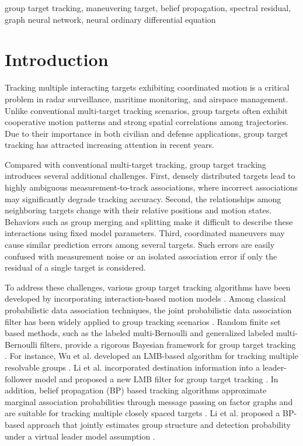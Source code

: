 \documentclass[10pt,doublecolumn]{IEEEtaes}
\begin{document}
\begin{IEEEkeywords}
group target tracking, maneuvering target, belief propagation, spectral residual, graph neural network, neural ordinary differential equation
\end{IEEEkeywords}

\section{Introduction}

Tracking multiple interacting targets exhibiting coordinated motion is a critical problem in radar surveillance, maritime monitoring, and airspace management. Unlike conventional multi-target tracking scenarios, group targets often exhibit cooperative motion patterns and strong spatial correlations among trajectories. Due to their importance in both civilian and defense applications, group target tracking has attracted increasing attention in recent years.

Compared with conventional multi-target tracking, group target tracking introduces several additional challenges. First, densely distributed targets lead to highly ambiguous measurement-to-track associations, where incorrect associations may significantly degrade tracking accuracy. Second, the relationships among neighboring targets change with their relative positions and motion states. Behaviors such as group merging and splitting make it difficult to describe these interactions using fixed model parameters. Third, coordinated maneuvers may cause similar prediction errors among several targets. Such errors are easily confused with measurement noise or an isolated association error if only the residual of a single target is considered.

To address these challenges, various group target tracking algorithms have been developed by incorporating interaction-based motion models \cite{shen2025adaptive,zhu2024cbmember,su2023variational}. Among classical probabilistic data association techniques, the joint probabilistic data association filter has been widely applied to group tracking scenarios \cite{lin2021improved,zhang2023group,cong2018group}. Random finite set based methods, such as the labeled multi-Bernoulli and generalized labeled multi-Bernoulli filters, provide a rigorous Bayesian framework for group target tracking \cite{liu2018structure,li2023resolvable}. For instance, Wu et al. developed an LMB-based algorithm for tracking multiple resolvable groups \cite{wu2025tracking}. Li et al. incorporated destination information into a leader-follower model and proposed a new LMB filter for group target tracking \cite{li2023labeled}. In addition, belief propagation (BP) based tracking algorithms approximate marginal association probabilities through message passing on factor graphs and are suitable for tracking multiple closely spaced targets \cite{meyer2018message,shen2026joint}. Li et al. proposed a BP-based approach that jointly estimates group structure and detection probability under a virtual leader model assumption \cite{li2024belief}.
\end{document}
